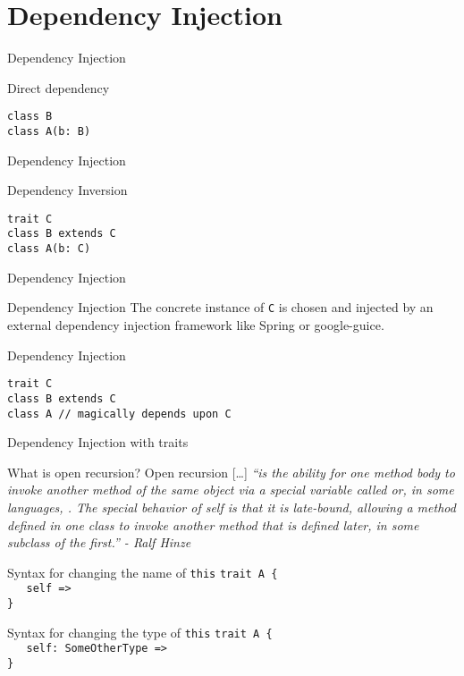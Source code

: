 \section{Dependency Injection}
\begin{frame}[fragile]{Dependency Injection}
\begin{exampleblock}{Direct dependency}
\begin{lstlisting}
class B
class A(b: B)
\end{lstlisting}
\end{exampleblock}
\end{frame}

\begin{frame}[fragile]{Dependency Injection}
\begin{exampleblock}{Dependency Inversion}
\begin{lstlisting}
trait C
class B extends C
class A(b: C)
\end{lstlisting}
\end{exampleblock}
\end{frame}

\begin{frame}[fragile]{Dependency Injection}
\begin{block}{Dependency Injection}
The concrete instance of \lstinline!C! is chosen and injected by an external
dependency injection framework like Spring or google-guice.
\end{block}
\begin{exampleblock}{Dependency Injection}
\begin{lstlisting}
trait C
class B extends C
class A // magically depends upon C
\end{lstlisting}
\end{exampleblock}
\end{frame}

\begin{frame}[fragile]{Dependency Injection with traits}
\begin{block}{What is open recursion?}
Open recursion [\ldots] \emph{``is the ability for one method body to invoke
another method of the same object via a special variable called 
or, in some languages, . The special behavior of self is that it
is late-bound, allowing a method defined in one class to invoke another method
that is defined later, in some subclass of the first.'' - Ralf Hinze}
\end{block}
\pause
\begin{exampleblock}{Syntax for changing the name of \lstinline!this!}
\lstinline!trait A {!\\
\lstinline!   self =>!\\
\lstinline!}!
\end{exampleblock}
\pause
\begin{exampleblock}{Syntax for changing the type of \lstinline!this!}
\lstinline!trait A {!\\
\lstinline!   self: SomeOtherType =>!\\
\lstinline!}!
\end{exampleblock}
\end{frame}

